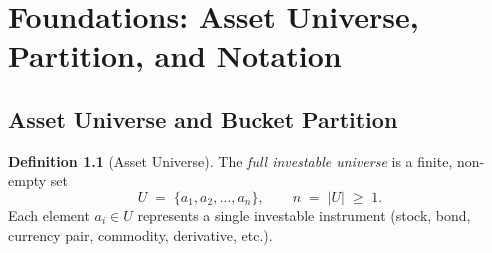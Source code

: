 \documentclass[12pt,openany]{book}
\newcommand{\calU}{\mathcal{U}}
\numberwithin{equation}{chapter}
\theoremstyle{plain}
\theoremstyle{definition}
\newtheorem{definition}[theorem]{Definition}
\theoremstyle{remark}
\def\calU{U}%
\def\mathcal#1{#1}%
\begin{document}
\bigskip



\chapter{Foundations: Asset Universe, Partition, and Notation}
\label{ch:foundations}

\section{Asset Universe and Bucket Partition}

\begin{definition}[Asset Universe]
\label{def:universe}
The \emph{full investable universe} is a finite, non-empty set
\begin{equation}
  \calU \;=\; \{a_1, a_2, \ldots, a_n\},
  \qquad n \;=\; |\calU| \;\geq\; 1.
  \label{eq:universe}
\end{equation}
Each element $a_i \in \calU$ represents a single investable instrument
(stock, bond, currency pair, commodity, derivative, etc.).
\end{definition}
\end{document}
